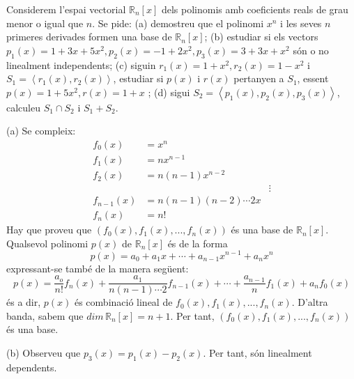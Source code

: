 \begin{exercici}
Considerem l’espai vectorial $\mathbb{R}_{n}\left[ x\right] $ dels
polinomis amb coeficients reals de grau menor o igual que $n$. Se pide:
(a) demostreu que el polinomi $x^{n}$ i les seves $n$ primeres derivades formen
una base de $\mathbb{R}_{n}\left[ x\right] $; (b) estudiar si els vectors $%
p_{1}(x)=1+3x+5x^{2},p_{2}(x)=-1+2x^{2},p_{3}(x)=3+3x+x^{2}$ són o no
linealment independents; (c) siguin $r_{1}(x)=1+x^{2},r_{2}(x)=1-x^{2}$ i $%
S_{1}=\left\langle r_{1}(x),r_{2}(x)\right\rangle $, estudiar si $%
p(x)$ i $r(x)$ pertanyen a $S_{1}$, essent $p(x)=1+5x^{2},r(x)=1+x$%
; (d) sigui $S_{2}=\left\langle
p_{1}(x),p_{2}(x),p_{3}(x)\right\rangle $, calculeu $S_{1}\cap
S_{2}$ i $S_{1}+S_{2}$.

\end{exercici}
\begin{solucio}
(a) Se compleix:%
\begin{align*}
f_{0}(x) &=x^{n} \\
f_{1}(x) &=nx^{n-1} \\
f_{2}(x) &=n(n-1)x^{n-2} \\
&&\vdots \\
f_{n-1}(x) &=n(n-1)(n-2)\cdots 2x \\
f_{n}(x) &=n!
\end{align*}%
Hay que proveu que $(f_{0}(x),f_{1}(x),...,f_{n}(x))$ és una base de $%
\mathbb{R}_{n}\left[ x\right] $. Qualsevol polinomi $p(x)$ de $\mathbb{R}%
_{n}\left[ x\right] $ és de la forma%
\begin{equation*}
p(x)=a_{0}+a_{1}x+\cdots +a_{n-1}x^{n-1}+a_{n}x^{n}
\end{equation*}%
expressant-se també de la manera següent:%
\begin{equation*}
p(x)=\frac{a_{o}}{n!}f_{n}(x)+\frac{a_{1}}{n(n-1)\cdots 2}f_{n-1}(x)+\cdots +%
\frac{a_{n-1}}{n}f_{1}(x)+a_{n}f_{0}(x)
\end{equation*}%
és a dir, $p(x)$ és combinació lineal de $%
f_{0}(x),f_{1}(x),...,f_{n}(x) $. D’altra banda, sabem que $dim\,\mathbb{R%
}_{n}\left[ x\right] =n+1$. Per tant, $(f_{0}(x),f_{1}(x),...,f_{n}(x))$ és
una base.

(b) Observeu que $p_{3}(x)=p_{1}(x)-p_{2}(x)$. Per tant, són
linealment dependents.


\end{solucio}
